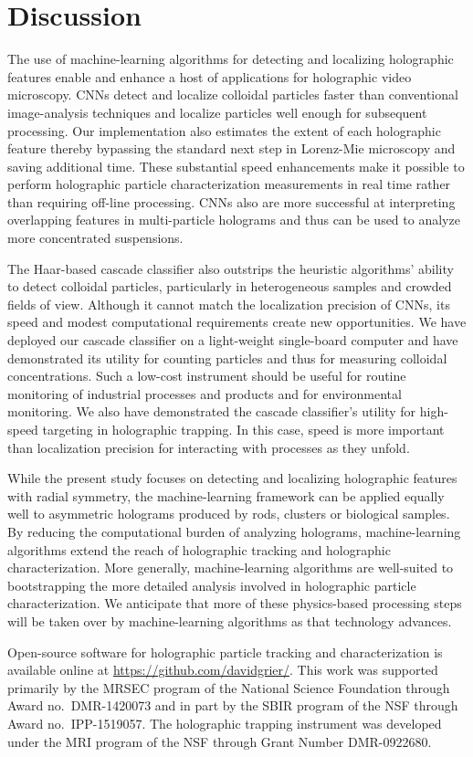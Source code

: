 \section{Discussion}

The use of machine-learning algorithms for detecting and
localizing holographic features enable and enhance a host of 
applications for holographic video microscopy.
CNNs detect and localize colloidal
particles faster than conventional image-analysis techniques
and localize particles well enough for subsequent processing.
Our implementation also estimates the extent of each holographic feature 
thereby bypassing the standard next step in Lorenz-Mie microscopy
\cite{cheong09} and saving additional time.
These substantial speed enhancements make it possible to
perform holographic particle characterization measurements in real
time rather than requiring off-line processing.
CNNs also are more successful at
interpreting overlapping features in multi-particle
holograms and thus can be used to analyze more concentrated
suspensions.

The Haar-based cascade classifier also outstrips the heuristic algorithms'
ability to detect colloidal particles, particularly in heterogeneous
samples and crowded fields of view.
Although it cannot match the localization precision of CNNs,
its speed and modest computational requirements
create new opportunities.
We have deployed our cascade classifier on a light-weight
single-board computer and have demonstrated its utility for counting particles
and thus for measuring colloidal concentrations.
Such a low-cost instrument should be useful for routine monitoring of
industrial processes and products and for environmental monitoring.
We also have demonstrated the cascade classifier's utility for
high-speed targeting in holographic trapping.  In this case, speed
is more important than localization precision for interacting with
processes as they unfold.

While the present study focuses on detecting and localizing
holographic features with radial symmetry,
the machine-learning framework can be applied equally well to
asymmetric holograms produced by rods, clusters
or biological samples.
By reducing the computational burden of analyzing holograms,
machine-learning algorithms extend the reach of holographic
tracking and holographic characterization.
More generally, machine-learning algorithms are well-suited to bootstrapping
the more detailed analysis involved in holographic particle
characterization.
We anticipate that more of these physics-based
processing steps will be taken over by machine-learning algorithms
as that technology advances.

Open-source software for holographic particle tracking and characterization
is available online at \url{https://github.com/davidgrier/}. 
This work was supported primarily by the MRSEC program of the
National Science Foundation through Award no.\ DMR-1420073
and in part by the SBIR program of the NSF through Award no.\
IPP-1519057.
The holographic trapping instrument was developed under the
MRI program of the NSF through Grant Number DMR-0922680.

